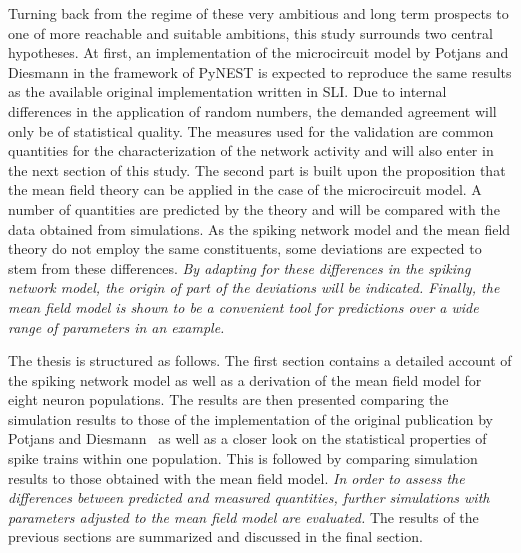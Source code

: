 Turning back from the regime of these very ambitious and long term prospects to 
one of more reachable and suitable ambitions, this study surrounds two central
hypotheses. At first, an implementation of the microcircuit model by
Potjans and Diesmann in the framework of PyNEST is expected to reproduce the 
same results as the available original implementation written in SLI. Due to
internal differences in the application of random numbers, the demanded agreement 
will only be of statistical quality. The measures used for the validation 
are common quantities for the characterization of the network 
activity and will also enter in the next section of this study. 
The second part is built upon the proposition that the mean field theory 
can be applied in the case of the
microcircuit model. A number of quantities are predicted by the theory and will 
be compared with the data obtained from simulations. As the spiking network model 
and the mean field theory do not employ the same constituents, some 
deviations are expected to stem from these differences. 
\emph{By adapting for these
differences in the spiking network model, the origin of part of the deviations 
will be indicated. 
Finally, the mean field model is shown to be a convenient tool for predictions
over a wide range of parameters in an example.}

The thesis is structured as follows. The first section contains a detailed account 
of the spiking network model as well as a derivation of the mean field model 
for eight neuron populations.  
The results are then presented comparing the simulation results to 
those of the implementation of the original publication by Potjans and 
Diesmann~\cite{potjans2014} as well as a closer look on the statistical properties 
of spike trains within one population. 
This is followed by comparing simulation results to those
obtained with the mean field model. 
\emph{In order to assess the differences between 
predicted and measured quantities, 
further simulations with parameters adjusted 
to the mean field model are evaluated.}
The results of the previous sections are summarized and discussed in the final section. 



